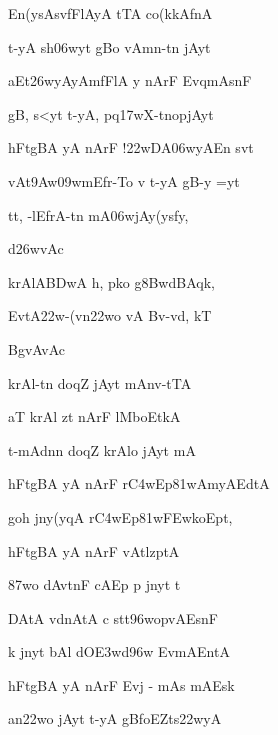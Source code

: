 {\dn En(ysAsvfFlAyA tTA co(kkAfnA \vegdn\dontdisplaylinenum}

{\dn t-yA s\2h\306wyt\? gBo{\qvb} vAmn-t\?n jAyt\?{\dandabdn} \dontdisplaylinenum}

{\dn aEt\326wyAyAmfFlA  y nArF EvqmAsnF \vegdn\dontdisplaylinenum}

{\dn gB\0, s\2<yt\? t-yA, pq\317wX-t\?nopjAyt\?{\dandabdn} \dontdisplaylinenum}

{\dn {}hFtgBA\0 yA nArF !\322wDA\306wyAEn s\?vt\? \vegdn\dontdisplaylinenum}

{\dn vAt\39Aw\?\309wmEfr-To v\4 t-yA gB\0-y =yt\?{\dandabdn} \dontdisplaylinenum}

{\dn tt, -lEfrA-t\?n mA\306wjAy(ys\2fy, \vegdn\dontdisplaylinenum}

{\dn d\?\326wvAc{\dandabdn}\dontdisplaylinenum }

{\dn krAlA\3BDwA h, p\0ko g\38BwdBAqk,{\dandadn} \dontdisplaylinenum}

{\dn EvtA\322w-(vn\322wo vA Bv-vd, kT \vegdn\dontdisplaylinenum}

{\dn BgvAvAc{\dandabdn}\dontdisplaylinenum }

{\dn krAl-t\?n doq\?Z jAyt\? mAnv-tTA{\dandadn} \dontdisplaylinenum}

{\dn aT krAl\2 zt\? nArF lMboEtkA{\dandadn}\dontdisplaylinenum }

{\dn t-mAdn\?n doq\?Z krAlo jAyt\? mA \vegdn\dontdisplaylinenum}

{\dn {}hFtgBA\0 yA nArF r\3C4wEp\381wAmyAEd\0tA{\dandabdn} \dontdisplaylinenum}

{\dn goh\2 jny\?(y\?qA r\3C4wEp\381w\3FEwkoEpt, \vegdn\dontdisplaylinenum}

{\dn {}hFtgBA\0 yA nArF vAtl\4zptA{\dandabdn} \dontdisplaylinenum}

{\dn {}\387wo dAvt\0nF cAEp p jnyt\? t \vegdn\dontdisplaylinenum}

{\dn {}DAtA\0 v\?dnAtA\0 c stt\396wopvAEsnF{\dandabdn} \dontdisplaylinenum}

{\dn {}k\2 jnyt\? bAl\2 dO\3E3wd\396w EvmAEntA \vegdn\dontdisplaylinenum}

{\dn {}hFtgBA\0 yA nArF Evj\? {\rs -\re} mAs mAEsk \dontdisplaylinenum}

{\dn an\322wo jAyt\? t-yA gB\0foEZts\2\322wyA \vegdn\dontdisplaylinenum}

